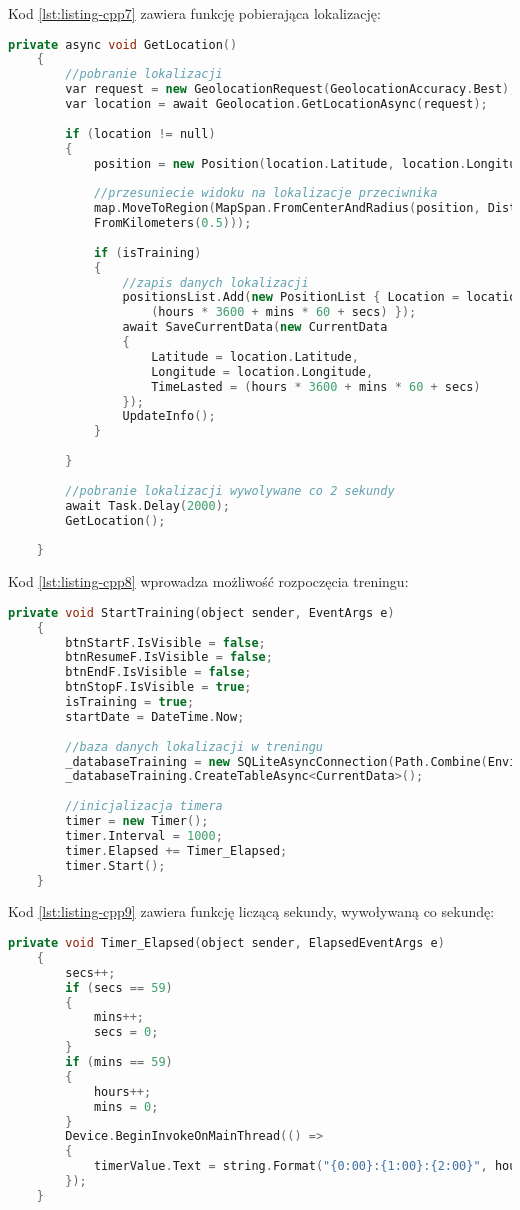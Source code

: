 Kod \ref{lst:listing-cpp7} zawiera funkcję pobierająca lokalizację:
\begin{lstlisting}[caption=Pobranie lokalizacji, label={lst:listing-cpp7}, language=C++]
	private async void GetLocation()
	{
		//pobranie lokalizacji
		var request = new GeolocationRequest(GeolocationAccuracy.Best);
		var location = await Geolocation.GetLocationAsync(request);
		
		if (location != null)
		{
			position = new Position(location.Latitude, location.Longitude);
			
			//przesuniecie widoku na lokalizacje przeciwnika
			map.MoveToRegion(MapSpan.FromCenterAndRadius(position, Distance.
			FromKilometers(0.5)));
			
			if (isTraining)
			{   
				//zapis danych lokalizacji
				positionsList.Add(new PositionList { Location = location, TimeLasted = 
					(hours * 3600 + mins * 60 + secs) });
				await SaveCurrentData(new CurrentData
				{
					Latitude = location.Latitude,
					Longitude = location.Longitude,
					TimeLasted = (hours * 3600 + mins * 60 + secs)
				});
				UpdateInfo();
			}
			
		}
		
		//pobranie lokalizacji wywolywane co 2 sekundy
		await Task.Delay(2000);
		GetLocation();
		
	}
\end{lstlisting}

Kod \ref{lst:listing-cpp8} wprowadza możliwość rozpoczęcia treningu:
\begin{lstlisting}[caption=Rozpoczęcie treningu, label={lst:listing-cpp8}, language=C++]
	private void StartTraining(object sender, EventArgs e)
	{
		btnStartF.IsVisible = false;
		btnResumeF.IsVisible = false;
		btnEndF.IsVisible = false;
		btnStopF.IsVisible = true;
		isTraining = true;
		startDate = DateTime.Now;
		
		//baza danych lokalizacji w treningu
		_databaseTraining = new SQLiteAsyncConnection(Path.Combine(Environment.GetFolderPath(Environment.SpecialFolder.LocalApplicationData), "training" + startDate.ToString("dd_MM_yyyy_HH_mm_ss") + ".db3"));
		_databaseTraining.CreateTableAsync<CurrentData>();
		
		//inicjalizacja timera
		timer = new Timer();
		timer.Interval = 1000;
		timer.Elapsed += Timer_Elapsed;
		timer.Start();
	}
\end{lstlisting}

Kod \ref{lst:listing-cpp9} zawiera funkcję liczącą sekundy, wywoływaną co sekundę:
\begin{lstlisting}[caption=Liczenie sekund (co sekundę:), label={lst:listing-cpp9}, language=C++]
	private void Timer_Elapsed(object sender, ElapsedEventArgs e)
	{
		secs++;
		if (secs == 59)
		{
			mins++;
			secs = 0;
		}
		if (mins == 59)
		{
			hours++;
			mins = 0;
		}
		Device.BeginInvokeOnMainThread(() =>
		{
			timerValue.Text = string.Format("{0:00}:{1:00}:{2:00}", hours, mins, secs);
		});
	}
\end{lstlisting}


